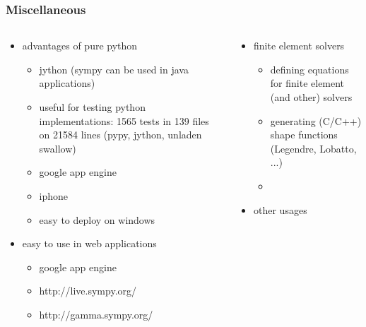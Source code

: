 \documentclass[handout]{beamer}
\begin{document}
\begin{frame}[fragile]
    \frametitle{Miscellaneous}

    \begin{columns}
        \begin{column}[l]{0.5\textwidth}
            \begin{itemize}
                \item advantages of pure python
                    \begin{itemize}
                        \item jython (sympy can be used in java applications)
                        \item useful for testing python implementations: 1565 tests in 139 files on 21584 lines (pypy, jython, unladen swallow)
                        \item google app engine
                        \item iphone
                        \item easy to deploy on windows
                    \end{itemize}
                \item easy to use in web applications
                    \begin{itemize}
                        \item google app engine
                        \item http://live.sympy.org/
                        \item http://gamma.sympy.org/
                    \end{itemize}
            \end{itemize}
        \end{column}
        \begin{column}[r]{0.5\textwidth}
            \begin{itemize}
                \item finite element solvers
                    \begin{itemize}
                        \item defining equations for finite element (and other) solvers
                        \item generating (C/C++) shape functions (Legendre, Lobatto, ...)
                        \item \structure{\ldots}
                    \end{itemize}
                \item other usages

\end{itemize}
\end{column}
\end{columns}
\end{frame}
\end{document}
